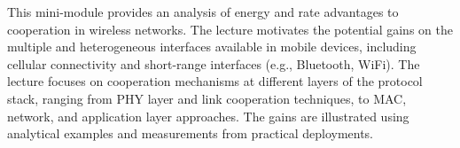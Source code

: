 This mini-module provides an analysis of energy and rate advantages to cooperation in wireless networks. The lecture motivates the potential gains on the multiple and heterogeneous interfaces available in mobile devices, including cellular connectivity and short-range interfaces (e.g., Bluetooth, WiFi). The lecture focuses on cooperation mechanisms at different layers of the protocol stack, ranging from PHY layer and link cooperation techniques, to MAC, network, and application layer approaches. The gains are illustrated using analytical examples and measurements from practical deployments. 